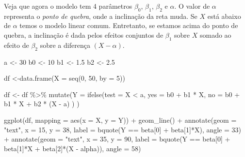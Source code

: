 \documentclass[
]{book}
\newenvironment{Shaded}{\begin{snugshade}}{\end{snugshade}}
\newcommand{\AttributeTok}[1]{\textcolor[rgb]{0.77,0.63,0.00}{#1}}
\newcommand{\DecValTok}[1]{\textcolor[rgb]{0.00,0.00,0.81}{#1}}
\newcommand{\FloatTok}[1]{\textcolor[rgb]{0.00,0.00,0.81}{#1}}
\newcommand{\FunctionTok}[1]{\textcolor[rgb]{0.00,0.00,0.00}{#1}}
\newcommand{\NormalTok}[1]{#1}
\newcommand{\OtherTok}[1]{\textcolor[rgb]{0.56,0.35,0.01}{#1}}
\newcommand{\SpecialCharTok}[1]{\textcolor[rgb]{0.00,0.00,0.00}{#1}}
\newcommand{\StringTok}[1]{\textcolor[rgb]{0.31,0.60,0.02}{#1}}
\begin{document}
Veja que agora o modelo tem 4 parâmetros \(\beta_0\), \(\beta_1\), \(\beta_2\) e \(\alpha\). O valor de \(\alpha\) representa o \emph{ponto de quebra}, onde a inclinação da reta muda. Se \(X\) está abaixo de \(\alpha\) temos o modelo linear comum. Entretanto, se estamos acima do ponto de quebra, a inclinação é dada pelos efeitos conjuntos de \(\beta_1\) sobre \(X\) somado ao efeito de \(\beta_2\) sobre a diferença \((X - \alpha)\).

\begin{Shaded}
\begin{Highlighting}[]
\NormalTok{a }\OtherTok{\textless{}{-}} \DecValTok{30}
\NormalTok{b0 }\OtherTok{\textless{}{-}} \DecValTok{10}
\NormalTok{b1 }\OtherTok{\textless{}{-}} \FloatTok{1.5}
\NormalTok{b2 }\OtherTok{\textless{}{-}} \FloatTok{2.5}

\NormalTok{df }\OtherTok{\textless{}{-}}\FunctionTok{data.frame}\NormalTok{(}\AttributeTok{X =} \FunctionTok{seq}\NormalTok{(}\DecValTok{0}\NormalTok{, }\DecValTok{50}\NormalTok{, }\AttributeTok{by =} \DecValTok{5}\NormalTok{))}

\NormalTok{df }\OtherTok{\textless{}{-}}\NormalTok{ df }\SpecialCharTok{\%\textgreater{}\%} 
  \FunctionTok{mutate}\NormalTok{(}\AttributeTok{Y =} \FunctionTok{ifelse}\NormalTok{(}\AttributeTok{test =}\NormalTok{ X }\SpecialCharTok{\textless{}}\NormalTok{ a, }
                    \AttributeTok{yes =}\NormalTok{ b0 }\SpecialCharTok{+}\NormalTok{ b1 }\SpecialCharTok{*}\NormalTok{ X,}
                    \AttributeTok{no =}\NormalTok{ b0 }\SpecialCharTok{+}\NormalTok{ b1 }\SpecialCharTok{*}\NormalTok{ X }\SpecialCharTok{+}\NormalTok{ b2 }\SpecialCharTok{*}\NormalTok{ (X }\SpecialCharTok{{-}}\NormalTok{ a)}
\NormalTok{                    )}
\NormalTok{         )}

\FunctionTok{ggplot}\NormalTok{(df, }\AttributeTok{mapping =} \FunctionTok{aes}\NormalTok{(}\AttributeTok{x =}\NormalTok{ X, }\AttributeTok{y =}\NormalTok{ Y)) }\SpecialCharTok{+}
  \FunctionTok{geom\_line}\NormalTok{() }\SpecialCharTok{+}
  \FunctionTok{annotate}\NormalTok{(}\AttributeTok{geom =} \StringTok{"text"}\NormalTok{, }\AttributeTok{x =} \DecValTok{15}\NormalTok{, }\AttributeTok{y =} \DecValTok{38}\NormalTok{, }
           \AttributeTok{label =} \FunctionTok{bquote}\NormalTok{(Y }\SpecialCharTok{==}\NormalTok{ beta[}\DecValTok{0}\NormalTok{] }\SpecialCharTok{+}\NormalTok{ beta[}\DecValTok{1}\NormalTok{]}\SpecialCharTok{*}\NormalTok{X), }\AttributeTok{angle =} \DecValTok{33}\NormalTok{) }\SpecialCharTok{+}
  \FunctionTok{annotate}\NormalTok{(}\AttributeTok{geom =} \StringTok{"text"}\NormalTok{, }\AttributeTok{x =} \DecValTok{35}\NormalTok{, }\AttributeTok{y =} \DecValTok{90}\NormalTok{, }
           \AttributeTok{label =} \FunctionTok{bquote}\NormalTok{(Y }\SpecialCharTok{==}\NormalTok{ beta[}\DecValTok{0}\NormalTok{] }\SpecialCharTok{+}\NormalTok{ beta[}\DecValTok{1}\NormalTok{]}\SpecialCharTok{*}\NormalTok{X }\SpecialCharTok{+}\NormalTok{ beta[}\DecValTok{2}\NormalTok{]}\SpecialCharTok{*}\NormalTok{(X }\SpecialCharTok{{-}}\NormalTok{ alpha)), }\AttributeTok{angle =} \DecValTok{58}\NormalTok{)}
\end{Highlighting}
\end{Shaded}
\end{document}
